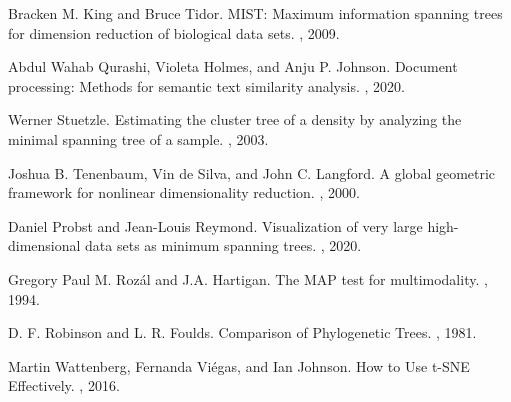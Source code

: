\documentclass{article}
\begin{document}
\begin{thebibliography}{10}
Bracken M. King and Bruce Tidor.
\newblock MIST: Maximum information spanning trees for dimension reduction of biological data sets.
, 2009.

Abdul Wahab Qurashi, Violeta Holmes, and Anju P. Johnson.
\newblock Document processing: Methods for semantic text similarity analysis.
, 2020.

Werner Stuetzle.
\newblock Estimating the cluster tree of a density by analyzing the minimal spanning tree of a sample.
, 2003.

Joshua B. Tenenbaum, Vin de Silva, and John C. Langford.
\newblock A global geometric framework for nonlinear dimensionality reduction.
, 2000.

Daniel Probst and Jean-Louis Reymond.
\newblock Visualization of very large high-dimensional data sets as minimum spanning trees.
, 2020.

Gregory Paul M. Roz\'al and J.A. Hartigan.
\newblock The MAP test for multimodality.
, 1994.

D. F. Robinson and L. R. Foulds.
\newblock Comparison of Phylogenetic Trees.
, 1981.

Martin Wattenberg, Fernanda Vi\'egas, and Ian Johnson.
\newblock How to Use t-SNE Effectively.
, 2016.

\end{thebibliography}
\end{document}
